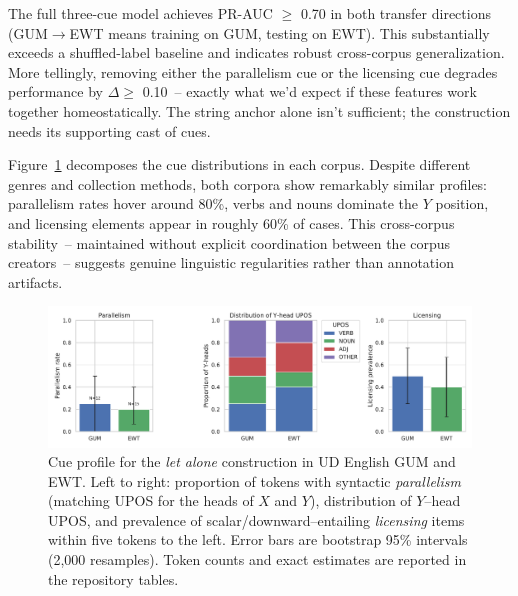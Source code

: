 \documentclass[12pt]{article}
\begin{document}
The full three-cue model achieves PR-AUC $\geq$ 0.70 in both transfer directions (GUM$\to$EWT means training on GUM, testing on EWT). This substantially exceeds a shuffled-label baseline and indicates robust cross-corpus generalization. More tellingly, removing either the parallelism cue or the licensing cue degrades performance by $\Delta \geq$ 0.10~-- exactly what we'd expect if these features work together homeostatically. The string anchor alone isn't sufficient; the construction needs its supporting cast of cues.

Figure~\ref{fig:let-alone-profile} decomposes the cue distributions in each corpus. Despite different genres and collection methods, both corpora show remarkably similar profiles: parallelism rates hover around 80\%, verbs and nouns dominate the $Y$ position, and licensing elements appear in roughly 60\% of cases. This cross-corpus stability~-- maintained without explicit coordination between the corpus creators~-- suggests genuine linguistic regularities rather than annotation artifacts.

\begin{figure}[t]
  \centering
  \includegraphics[width=\linewidth]{images/let_alone_profile.pdf}
  \caption{Cue profile for the \textit{let alone} construction in UD English GUM and EWT. Left to right: proportion of tokens with syntactic \textit{parallelism} (matching UPOS for the heads of $X$ and $Y$), distribution of $Y$–head UPOS, and prevalence of scalar/downward–entailing \textit{licensing} items within five tokens to the left. Error bars are bootstrap 95\% intervals (2{,}000 resamples). Token counts and exact estimates are reported in the repository tables.}
  \label{fig:let-alone-profile}
\end{figure}
\end{document}
